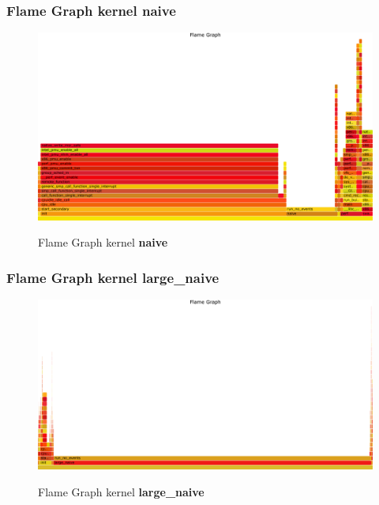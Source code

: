 \documentclass[conference,compsoc]{IEEEtran}
\begin{document}

    \subsubsection{Flame Graph kernel \textbf{naive}}
    \begin{figure}[H]
    \centering
    \caption{ Flame Graph kernel \textbf{naive} }
    \includegraphics[width=1\columnwidth]{PNG/perf_kernel_naive.png}
    \label{fig:flame_naive}
    \end{figure}

    \subsubsection{Flame Graph kernel \textbf{large\_naive}}
    \begin{figure}[H]
    \centering
    \caption{ Flame Graph kernel \textbf{large\_naive} }
    \includegraphics[width=1\columnwidth]{PNG/perf_kernel_large_naive.png}
    \label{fig:flame_naive}
    \end{figure}
\end{document}
